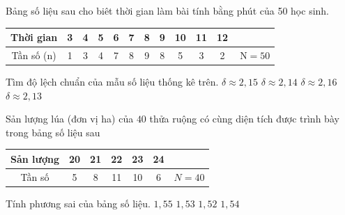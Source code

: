 \begin{ex}%
	Bảng số liệu sau cho biêt thời gian làm bài tính bằng phút của 50 học sinh.
	\begin{center}
		\begin{tabular}{|c|c|c|c|c|c|c|c|c|c|c|c|}
			\hline
			Thời gian & 3 & 4 & 5 & 6 & 7 & 8 & 9 & 10 & 11 & 12 & \\
			\hline
			Tần số (n) & 1 & 3 & 4 & 7 & 8 & 9 & 8 & 5 & 3 & 2 & $\mathrm{~N}=50$ \\
			\hline
		\end{tabular}
	\end{center}
	
	Tìm độ lệch chuẩn của mẫu số liệu thống kê trên.
	\choice
	{$\delta \approx 2{,}15$}
	{$\delta \approx 2{,}14$}
	{$\delta \approx 2{,}16$}
	{\True $\delta \approx 2{,}13$}
\end{ex}

\begin{ex}%
	Sản lượng lúa (đơn vị ha) của $40$ thửa ruộng có cùng diện tích được trình bày trong bảng số liệu sau
	\begin{center}
		\begin{tabular}{|c|c|c|c|c|c|c|}
			\hline
			Sản lượng & 20 & 21 & 22 & 23 & 24 & \\
			\hline
			Tần số & 5 & 8 & 11 & 10 & 6 & $N=40$ \\
			\hline
		\end{tabular}
	\end{center}
	
	Tính phương sai của bảng số liệu.
	\choice
	{$1{,}55$}
	{$1{,}53$}
	{$1{,}52$}
	{\True $1{,}54$}
\end{ex}

